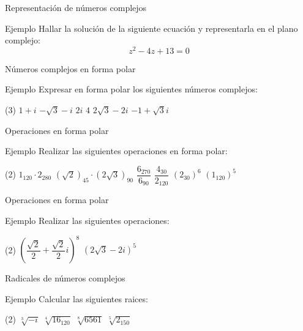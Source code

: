 \documentclass[8pt]{beamer}
\begin{document}
\begin{frame}[t]{Representación de números complejos}
\begin{exampleblock}{Ejemplo}
Hallar la solución de la siguiente ecuación y representarla en el plano complejo:
\[ z^2-4z+13=0 \]
\end{exampleblock}
\end{frame}

\begin{frame}[t]{Números complejos en forma polar}
\begin{exampleblock}{Ejemplo}
Expresar en forma polar los siguientes números complejos:
\begin{tasks}[label=\alph*)](3)
\task $1+i$
\task $-\sqrt{3}-i$
\task $2i$
\task $4$
\task $2\sqrt{3}-2i$
\task $-1+\sqrt{3}i$
\end{tasks}
\end{exampleblock}

\end{frame}

\begin{frame}[t]{Operaciones en forma polar}
\begin{exampleblock}{Ejemplo}
Realizar las siguientes operaciones en forma polar:
\begin{tasks}[label=\alph*)](2)
\task $1_{120} \cdot 2_{280}$
\task $\left(\sqrt{2} \right)_{45} \cdot \left( 2\sqrt{3} \right)_{90}$
\task $\dfrac{6_{270}}{6_{90}}$
\task $\dfrac{4_{30}}{2_{120}}$
\task $\left( 2_{30}\right)^6$
\task $\left( 1_{120}\right)^5$
\end{tasks}
\end{exampleblock}
\end{frame}

\begin{frame}[t]{Operaciones en forma polar}
\begin{exampleblock}{Ejemplo}
Realizar las siguientes operaciones:
\begin{tasks}[label=\alph*)](2)
\task $\left( \dfrac{\sqrt{2}}{2}+ \dfrac{\sqrt{2}}{2} i\right)^8$
\task $\left( 2\sqrt{3}-2i \right)^5 $
\end{tasks}
\end{exampleblock}
\end{frame}


\begin{frame}[t]{Radicales de números complejos}
\begin{exampleblock}{Ejemplo}
Calcular las siguientes raices:
\begin{tasks}[label=\alph*)](2)
\task $\sqrt[3]{-i}$
\task $\sqrt[4]{16_{120}}$
\task $\sqrt[8]{6561}$
\task $\sqrt[5]{2_{150}}$
\end{tasks}
\end{exampleblock}
\end{frame}
\end{document}
